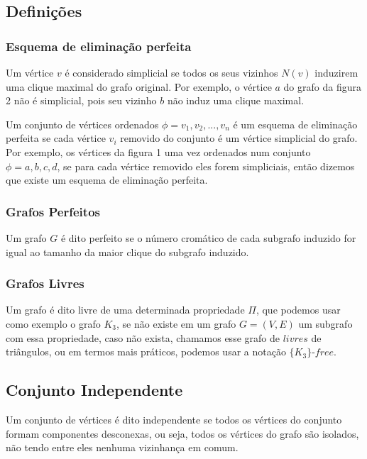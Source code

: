 \subsection{Definições}

\subsubsection{Esquema de eliminação perfeita}

Um vértice $v$ é considerado simplicial se todos os seus vizinhos $N(v)$ induzirem uma clique maximal do grafo original. Por exemplo, o vértice $a$ do grafo da figura 2 não é simplicial, pois seu vizinho $b$ não induz uma clique maximal.

Um conjunto de vértices ordenados $\phi = v_1, v_2, ..., v_n$ é um esquema de eliminação perfeita se cada vértice $v_i$ removido do conjunto é um vértice simplicial do grafo. Por exemplo, os vértices da figura 1 uma vez ordenados num conjunto $\phi = a, b, c, d$, se para cada vértice removido eles forem simpliciais, então dizemos que existe um esquema de eliminação perfeita.

\subsubsection{Grafos Perfeitos}

Um grafo $G$ é dito perfeito se o número cromático de cada subgrafo induzido for igual ao tamanho da maior clique do subgrafo induzido.

\subsubsection{Grafos Livres}

Um grafo é dito livre de uma determinada propriedade $\Pi$, que podemos usar como exemplo o grafo $K_3$, se não existe em um grafo $G = (V, E)$ um subgrafo com essa propriedade, caso não exista, chamamos esse grafo de $livres$ de triângulos, ou em termos mais práticos, podemos usar a notação $\{K_3\}$-$free$.  

\subsection{Conjunto Independente}

Um conjunto de vértices é dito independente se todos os vértices do conjunto formam componentes desconexas, ou seja, todos os vértices do grafo são isolados, não tendo entre eles nenhuma vizinhança em comum.